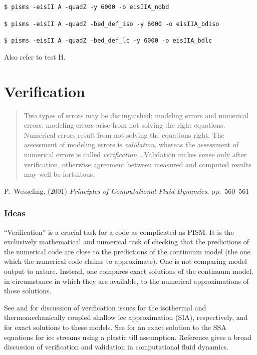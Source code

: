 \documentclass[11pt,final]{amsart}
\begin{document}
\verb|$ pisms -eisII A -quadZ -y 6000 -o eisIIA_nobd|

\verb|$ pisms -eisII A -quadZ -bed_def_iso -y 6000 -o eisIIA_bdiso|

\verb|$ pisms -eisII A -quadZ -bed_def_lc -y 6000 -o eisIIA_bdlc|

Also refer to test H.



\clearpage\newpage
\section{Verification}\label{sect:verif}

\bigskip
\begin{quote}  Two types of errors may be distinguished: modeling errors and numerical errors.  modeling errors arise from not solving the right equations.  Numerical errors result from not solving the equations right.  The assessment of modeling errors is \emph{validation}, whereas the assessment of numerical errors is called \emph{verification} \dots  Validation makes sense only after verification, otherwise agreement between measured and computed results may well be fortuitous.
\end{quote}
\hfill P.~Wesseling, (2001)  \emph{Principles of Computational Fluid Dynamics}, pp.~560--561 \cite{Wesseling}
\bigskip

\subsubsection*{Ideas} ``Verification'' is a crucial task for a code as complicated as PISM.  It is the exclusively mathematical and numerical task of checking that the predictions of the numerical code are close to the predictions of the continuum model (the one which the numerical code claims to approximate).  One is not comparing model output to nature.  Instead, one compares exact solutions of the continuum model, in circumstance in which they are available, to the numerical approximations of those solutions.

See \cite{BLKCB} and \cite{BBL} for discussion of verification issues for the isothermal and thermomechanically coupled shallow ice approximation (SIA), respectively, and for exact solutions to these models.  See \cite{SchoofStream} for an exact solution to the SSA equations for ice streams using a plastic till assumption.  Reference \cite{Roache} gives a broad discussion of verification and validation in computational fluid dynamics.
\end{document}
